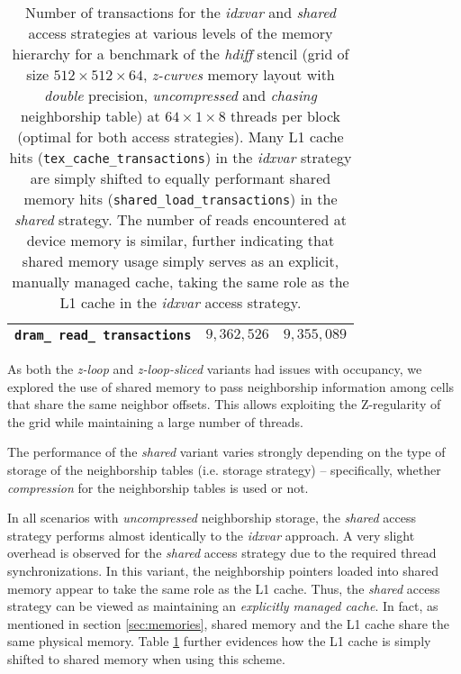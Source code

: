 \begin{table}
\begin{center}
\begin{tabular}{l l l}
        \texttt{dram\_ read\_ transactions} & $9,362,526$ & $9,355,089$ \\
        \hline
    \end{tabular}
	\end{center}
    \caption{\label{tab:access-shared} Number of transactions for the \emph{idxvar} and \emph{shared} access strategies at various levels of the memory hierarchy for a benchmark of the \emph{hdiff} stencil (grid of size $512\times 512\times 64$, \emph{z-curves} memory layout with \emph{double} precision, \emph{uncompressed} and \emph{chasing} neighborship table) at $64\times 1\times 8$ threads per block (optimal for both access strategies). Many L1 cache hits (\texttt{tex\_cache\_transactions}) in the \emph{idxvar} strategy are simply shifted to equally performant shared memory hits (\texttt{shared\_load\_transactions}) in the \emph{shared} strategy. The number of reads encountered at device memory is similar, further indicating that shared memory usage simply serves as an explicit, manually managed cache, taking the same role as the L1 cache in the \emph{idxvar} access strategy.}
\end{table}

As both the \emph{z-loop} and \emph{z-loop-sliced} variants had issues with occupancy, we explored the use of shared memory to pass neighborship information among cells that share the same neighbor offsets. This allows exploiting the Z-regularity of the grid while maintaining a large number of threads.

The performance of the \emph{shared} variant varies strongly depending on the type of storage of the neighborship tables (i.e. storage strategy) -- specifically, whether \emph{compression} for the neighborship tables is used or not.

In all scenarios with \emph{uncompressed} neighborship storage, the \emph{shared} access strategy performs almost identically to the \emph{idxvar} approach. A very slight overhead is observed for the \emph{shared} access strategy due to the required thread synchronizations. In this variant, the neighborship pointers loaded into shared memory appear to take the same role as the L1 cache. Thus, the \emph{shared} access strategy can be viewed as maintaining an \emph{explicitly managed cache}. In fact, as mentioned in section \ref{sec:memories}, shared memory and the L1 cache share the same physical memory. Table \ref{tab:access-shared} further evidences how the L1 cache is simply shifted to shared memory when using this scheme.

